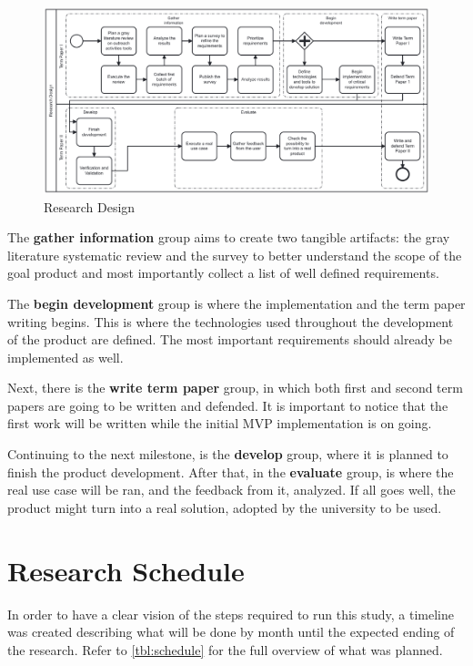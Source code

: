 \begin{figure}[htb]
    \caption{Research Design}\label{fig:research-design}
    \begin{center}
        \includegraphics[width=16cm]{img/research design.pdf}
    \end{center}
\end{figure}

The \textbf{gather information} group aims to create two tangible artifacts: the gray literature systematic review and the survey to better understand the scope of the goal product and most importantly collect a list of well defined requirements.

The \textbf{begin development} group is where the implementation and the term paper writing begins. This is where the technologies used throughout the development of the product are defined. The most important requirements should already be implemented as well.

Next, there is the \textbf{write term paper} group, in which both first and second term papers are going to be written and defended. It is important to notice that the first work will be written while the initial \ac{MVP} implementation is on going.

Continuing to the next milestone, is the \textbf{develop} group, where it is planned to finish the product development. After that, in the \textbf{evaluate} group, is where the real use case will be ran, and the feedback from it, analyzed. If all goes well, the product might turn into a real solution, adopted by the university to be used.

\section{Research Schedule}\label{sec:met-schedule}

In order to have a clear vision of the steps required to run this study, a timeline was created describing what will be done by month until the expected ending of the research. Refer to \autoref{tbl:schedule} for the full overview of what was planned.

